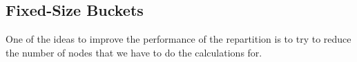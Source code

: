 
\subsection{Fixed-Size Buckets}\label{sec:Fixed-Size buckets}
One of the ideas to improve the performance of the repartition is to try to reduce the number of nodes that we have to do the calculations for.

